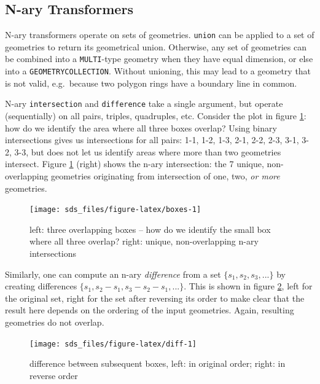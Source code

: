 \documentclass[]{book}
\begin{document}
\hypertarget{nary}{%
\subsection{N-ary Transformers}\label{nary}}

N-ary transformers operate on sets of geometries.
\texttt{union} can be applied to a set of geometries to return its
geometrical union. Otherwise, any set of geometries can be combined
into a \texttt{MULTI}-type geometry when they have equal dimension, or
else into a \texttt{GEOMETRYCOLLECTION}. Without unioning, this may
lead to a geometry that is not valid, e.g.~because two polygon
rings have a boundary line in common.

N-ary \texttt{intersection} and \texttt{difference} take a single argument,
but operate (sequentially) on all pairs, triples, quadruples, etc.
Consider the plot in figure \ref{fig:boxes}: how do we identify
the area where all three boxes overlap? Using binary intersections
gives us intersections for all pairs: 1-1, 1-2, 1-3, 2-1, 2-2, 2-3,
3-1, 3-2, 3-3, but does not let us identify areas where more than
two geometries intersect.
Figure \ref{fig:boxes} (right) shows the n-ary intersection: the 7
unique, non-overlapping geometries originating from intersection
of one, two, \emph{or more} geometries.

\begin{figure}

{\centering \texttt{[image: sds\_files/figure-latex/boxes-1]} 

}

\caption{left: three overlapping boxes -- how do we identify the small box where all three overlap? right: unique, non-overlapping n-ary intersections}\label{fig:boxes}
\end{figure}

Similarly, one can compute an n-ary \emph{difference} from a set \(\{s_1, s_2, s_3, ...\}\) by creating differences \(\{s_1, s_2-s_1, s_3-s_2-s_1, ...\}\). This is shown in figure \ref{fig:diff}, left for the original
set, right for the set after reversing its order to make clear that
the result here depends on the ordering of the input geometries. Again,
resulting geometries do not overlap.

\begin{figure}

{\centering \texttt{[image: sds\_files/figure-latex/diff-1]} 

}

\caption{difference between subsequent boxes, left: in original order; right: in reverse order}\label{fig:diff}
\end{figure}
\end{document}
